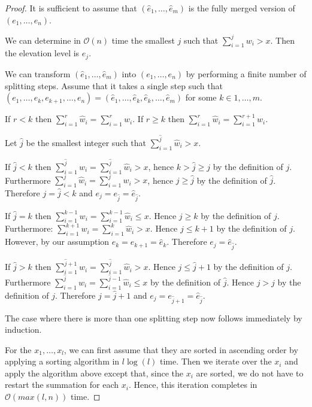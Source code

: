 \documentclass[11pt,a4paper]{article}
\newcommand{\bO}{\mathcal{O}}
\begin{document}
\begin{proof}
    It is sufficient to assume that $(\hat{e}_1,\ldots,\hat{e}_m)$ is the fully merged version of $(e_1,\ldots,e_n)$.

    We can determine in $\bO(n)$ time the smallest $j$ such that $\sum_{i=1}^j w_i > x$.
    Then the elevation level is $e_j$.

    We can transform $(\hat{e}_1,\ldots,\hat{e}_m)$ into $(e_1,\ldots,e_n)$ by performing a finite number of splitting steps.
    Assume that it takes a single step such that $(e_1,\ldots,e_k,e_{k+1},\ldots,e_n) = (\hat{e}_1,\ldots,\hat{e}_k,\hat{e}_k,\ldots,\hat{e}_m)$ for some $k\in{1,\ldots,m}$.

    If $r<k$ then $\sum_{i=1}^r \hat{w}_i = \sum_{i=1}^r w_i$.
    If $r\ge k$ then $\sum_{i=1}^r \hat{w}_i = \sum_{i=1}^{r+1} w_i$.

    Let $\hat{j}$ be the smallest integer such that $\sum_{i=1}^{\hat{j}} \hat{w}_i > x$.

    If $\hat{j}<k$ then $\sum_{i=1}^{\hat{j}} w_i = \sum_{i=1}^{\hat{j}} \hat{w}_i > x$, hence $k > \hat{j} \ge j$ by the definition of $j$.
    Furthermore $\sum_{i=1}^j \hat{w}_i = \sum_{i=1}^j w_i > x$, hence $j \ge \hat{j}$ by the definition of $\hat{j}$. 
    Therefore $j = \hat{j} < k$ and $e_j = e_{\hat{j}} = \hat{e}_{\hat{j}}$.

    If $\hat{j}=k$ then $\sum_{i=1}^{k-1} w_i = \sum_{i=1}^{k-1} \hat{w}_i \le x$.
    Hence $j\ge k$ by the definition of $j$.
    Furthermore: $\sum_{i=1}^{k+1} w_i = \sum_{i=1}^k \hat{w}_i > x$.
    Hence $j\le k+1$ by the definition of $j$.
    However, by our assumption $e_k = e_{k+1} = \hat{e}_k$.
    Therefore $e_j = \hat{e}_{\hat{j}}$.

    If $\hat{j}>k$ then $\sum_{i=1}^{\hat{j}+1} w_i = \sum_{i=1}^{\hat{j}} \hat{w}_i > x$.
    Hence $j\le \hat{j}+1$ by the definition of $j$.
    Furthermore $\sum_{i=1}^{\hat{j}} w_i = \sum_{i=1}^{\hat{j}-1} \hat{w}_i \le x$ by the definition of $\hat{j}$.
    Hence $j > \hat{j}$ by the definition of $j$.
    Therefore $j = \hat{j}+1$ and $e_j = e_{\hat{j}+1} = \hat{e}_{\hat{j}}$.

    The case where there is more than one splitting step now follows immediately by induction.

    For the $x_1,\ldots,x_l$, we can first assume that they are sorted in ascending order by applying a sorting algorithm in $l\log(l)$ time.
    Then we iterate over the $x_i$ and apply the algorithm above except that, since the $x_i$ are sorted, we do not have to restart the summation for each $x_i$.
    Hence, this iteration completes in $\bO(max(l, n))$ time.
\end{proof}
\end{document}
